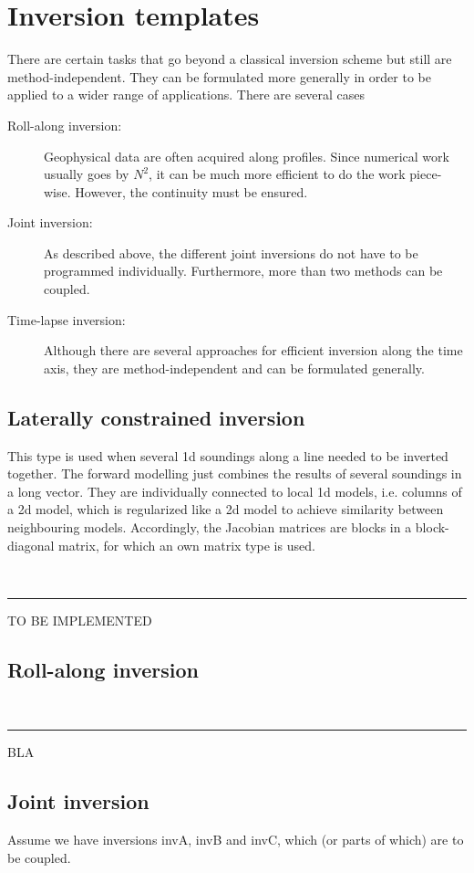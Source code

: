 \documentclass[a4paper,DIV12]{scrartcl}
\newcommand{\sperre}{\,\rule{1ex}{2ex}}
\begin{document}
\section{Inversion templates}
There are certain tasks that go beyond a classical inversion scheme but still are method-independent.
They can be formulated more generally in order to be applied to a wider range of applications.
There are several cases
\begin{description}
\item[Roll-along inversion:] Geophysical data are often acquired along profiles. Since numerical work usually goes by $N^2$, it can be much more efficient to do the work piece-wise. However, the continuity must be ensured.
\item[Joint inversion:] As described above, the different joint inversions do not have to be programmed individually. Furthermore, more than two methods can be coupled.
\item[Time-lapse inversion:] Although there are several approaches for efficient inversion along the time axis, they are method-independent and can be formulated generally.
\end{description}

\subsection{Laterally constrained inversion}
This type is used when several 1d soundings along a line needed to be inverted together.
The forward modelling just combines the results of several soundings in a long vector.
They are individually connected to local 1d models, i.e. columns of a 2d model, which is regularized like a 2d model to achieve similarity between neighbouring models.
Accordingly, the Jacobian matrices are blocks in a block-diagonal matrix, for which an own matrix type is used.

\sperre{TO BE IMPLEMENTED}

\subsection{Roll-along inversion}
\sperre{BLA}

\subsection{Joint inversion}
Assume we have inversions invA, invB and invC, which (or parts of which) are to be coupled.
\end{document}
